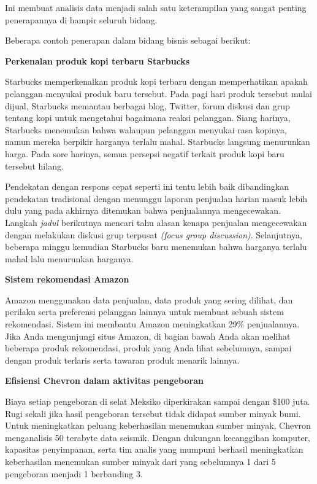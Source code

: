 \documentclass[openany]{book}
\begin{document}
Ini membuat analisis data menjadi salah satu keterampilan yang sangat
penting penerapannya di hampir seluruh bidang.

Beberapa contoh penerapan dalam bidang bisnis sebagai berikut:

\textbf{Perkenalan produk kopi terbaru Starbucks}

Starbucks memperkenalkan produk kopi terbaru dengan memperhatikan apakah
pelanggan menyukai produk baru tersebut. Pada pagi hari produk tersebut
mulai dijual, Starbucks memantau berbagai blog, Twitter, forum diskusi
dan grup tentang kopi untuk mengetahui bagaimana reaksi pelanggan. Siang
harinya, Starbucks menemukan bahwa walaupun pelanggan menyukai rasa
kopinya, namun mereka berpikir harganya terlalu mahal. Starbucks
langsung menurunkan harga. Pada sore harinya, semua persepsi negatif
terkait produk kopi baru tersebut hilang.

Pendekatan dengan respons cepat seperti ini tentu lebih baik
dibandingkan pendekatan tradisional dengan menunggu laporan penjualan
harian masuk lebih dulu yang pada akhirnya ditemukan bahwa penjualannya
mengecewakan. Langkah \emph{jadul} berikutnya mencari tahu alasan kenapa
penjualan mengecewakan dengan melakukan diskusi grup terpusat
\emph{(focus group discussion)}. Selanjutnya, beberapa minggu kemudian
Starbucks baru menemukan bahwa harganya terlalu mahal lalu menurunkan
harganya.

\textbf{Sistem rekomendasi Amazon}

Amazon menggunakan data penjualan, data produk yang sering dilihat, dan
perilaku serta preferensi pelanggan lainnya untuk membuat sebuah sistem
rekomendasi. Sistem ini membantu Amazon meningkatkan 29\% penjualannya.
Jika Anda mengunjungi situs Amazon, di bagian bawah Anda akan melihat
beberapa produk rekomendasi, produk yang Anda lihat sebelumnya, sampai
dengan produk terlaris serta tawaran produk menarik lainnya.

\textbf{Efisiensi Chevron dalam aktivitas pengeboran}

Biaya setiap pengeboran di selat Meksiko diperkirakan sampai dengan
\$100 juta. Rugi sekali jika hasil pengeboran tersebut tidak didapat
sumber minyak bumi. Untuk meningkatkan peluang keberhasilan menemukan
sumber minyak, Chevron menganalisis 50 terabyte data seismik. Dengan
dukungan kecanggihan komputer, kapasitas penyimpanan, serta tim analis
yang mumpuni berhasil meningkatkan keberhasilan menemukan sumber minyak
dari yang sebelumnya 1 dari 5 pengeboran menjadi 1 berbanding 3.
\end{document}
